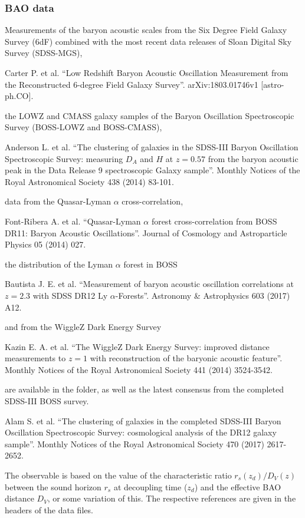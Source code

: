 \documentclass[letterpaper,12pt,english]{sphinxhowto}
\begin{document}
\subsubsection{BAO data}
\label{\detokenize{thedata:bao-data}}
Measurements of the baryon acoustic scales from the Six Degree Field Galaxy
Survey (6dF) combined with the most recent data releases of Sloan Digital Sky
Survey (SDSS-MGS), %
\begin{footnote}[4]\sphinxAtStartFootnote
Carter P. et al. “Low Redshift Baryon Acoustic Oscillation Measurement from the Reconstructed 6-degree Field Galaxy Survey”. arXiv:1803.01746v1 {[}astro-ph.CO{]}.
%
\end{footnote} the LOWZ and CMASS galaxy samples of the
Baryon Oscillation Spectroscopic Survey (BOSS-LOWZ and BOSS-CMASS),
%
\begin{footnote}[5]\sphinxAtStartFootnote
Anderson L. et al. “The clustering of galaxies in the SDSS-III Baryon Oscillation Spectroscopic Survey: measuring \(D_A\) and \(H\) at \(z = 0.57\) from the baryon acoustic peak in the Data Release 9 spectroscopic Galaxy sample”. Monthly Notices of the Royal Astronomical Society 438 (2014) 83-101.
%
\end{footnote} data from
the Quasar-Lyman \(\alpha\) cross-correlation, %
\begin{footnote}[6]\sphinxAtStartFootnote
Font-Ribera A. et al. “Quasar-Lyman \(\alpha\) forest cross-correlation from BOSS DR11: Baryon Acoustic Oscillations”. Journal of Cosmology and Astroparticle Physics 05 (2014) 027.
%
\end{footnote}
the distribution of the Lyman \(\alpha\) forest in BOSS %
\begin{footnote}[7]\sphinxAtStartFootnote
Bautista J. E. et al. “Measurement of baryon acoustic oscillation correlations at \(z = 2.3\) with SDSS DR12 Ly \(\alpha\)-Forests”. Astronomy \& Astrophysics 603 (2017) A12.
%
\end{footnote}
and from the
WiggleZ Dark Energy Survey %
\begin{footnote}[8]\sphinxAtStartFootnote
Kazin E. A. et al. “The WiggleZ Dark Energy Survey: improved distance measurements to \(z = 1\) with reconstruction of the baryonic acoustic feature”. Monthly Notices of the Royal Astronomical Society 441 (2014) 3524-3542.
%
\end{footnote} are available in the  folder,
as well as the latest consensus from the completed SDSS-III BOSS survey.
%
\begin{footnote}[9]\sphinxAtStartFootnote
Alam S. et al. “The clustering of galaxies in the completed SDSS-III Baryon Oscillation Spectroscopic Survey: cosmological analysis of the DR12 galaxy sample”. Monthly Notices of the Royal Astronomical Society 470 (2017) 2617-2652.
%
\end{footnote}
The observable is based on the value of
the characteristic ratio \(r_s(z_d)/D_V(z)\) between
the sound horizon \(r_s\) at decoupling time (\(z_d\)) and the
effective BAO distance \(D_V\), or some variation of this.
The respective references are given in the headers of the data files.
\end{document}
